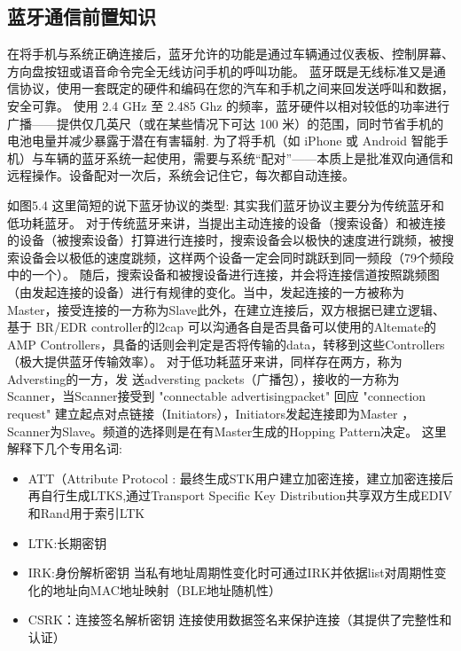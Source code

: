 \subsection{蓝牙通信前置知识}
在将手机与系统正确连接后，蓝牙允许的功能是通过车辆通过仪表板、控制屏幕、方向盘按钮或语音命令完全无线访问手机的呼叫功能。
蓝牙既是无线标准又是通信协议，使用一套既定的硬件和编码在您的汽车和手机之间来回发送呼叫和数据，安全可靠。
使用 2.4 GHz 至 2.485 Ghz 的频率，蓝牙硬件以相对较低的功率进行广播——提供仅几英尺（或在某些情况下可达 100 米）的范围，同时节省手机的电池电量并减少暴露于潜在有害辐射.
为了将手机（如 iPhone 或 Android 智能手机）与车辆的蓝牙系统一起使用，需要与系统“配对”——本质上是批准双向通信和远程操作。设备配对一次后，系统会记住它，每次都自动连接。

如图5.4
这里简短的说下蓝牙协议的类型: 
其实我们蓝牙协议主要分为传统蓝牙和低功耗蓝牙。
对于传统蓝牙来讲，当提出主动连接的设备（搜索设备）和被连接的设备（被搜索设备）打算进行连接时，搜索设备会以极快的速度进行跳频，被搜索设备会以极低的速度跳频，这样两个设备一定会同时跳跃到同一频段（79个频段中的一个）。
随后，搜索设备和被搜设备进行连接，并会将连接信道按照跳频图（由发起连接的设备）进行有规律的变化。当中，发起连接的一方被称为Master，接受连接的一方称为Slave此外，在建立连接后，双方根据已建立逻辑、基于 BR/EDR controller的l2cap 可以沟通各自是否具备可以使用的Altemate的AMP Controllers，具备的话则会判定是否将传输的data，转移到这些Controllers（极大提供蓝牙传输效率）。
对于低功耗蓝牙来讲，同样存在两方，称为Adversting的一方，发 送adversting packets（广播包），接收的一方称为Scanner，当Scanner接受到 "connectable advertisingpacket" 回应 "connection request"  建立起点对点链接（Initiators），Initiators发起连接即为Master ，Scanner为Slave。频道的选择则是在有Master生成的Hopping Pattern决定。
这里解释下几个专用名词:
\begin{itemize}
    \item ATT（Attribute Protocol : 最终生成STK用户建立加密连接，建立加密连接后再自行生成LTKS,通过Transport Specific Key Distribution共享双方生成EDIV和Rand用于索引LTK
    \item LTK:长期密钥
    \item IRK:身份解析密钥   当私有地址周期性变化时可通过IRK并依据list对周期性变化的地址向MAC地址映射（BLE地址随机性）
    \item CSRK：连接签名解析密钥  连接使用数据签名来保护连接（其提供了完整性和认证）
\end{itemize}


